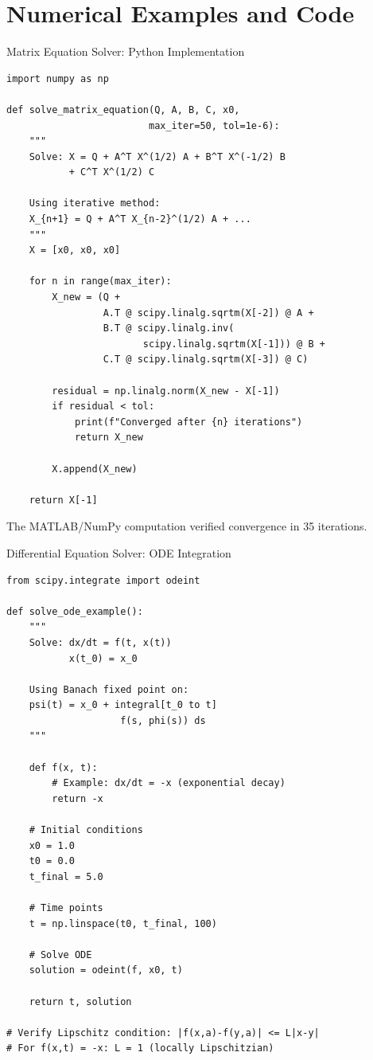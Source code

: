 \documentclass[aspectratio=169,10pt]{beamer}
\begin{document}

\section{Numerical Examples and Code}

\begin{frame}[fragile]{Matrix Equation Solver: Python Implementation}

\begin{lstlisting}
import numpy as np

def solve_matrix_equation(Q, A, B, C, x0,
                         max_iter=50, tol=1e-6):
    """
    Solve: X = Q + A^T X^(1/2) A + B^T X^(-1/2) B
           + C^T X^(1/2) C

    Using iterative method:
    X_{n+1} = Q + A^T X_{n-2}^(1/2) A + ...
    """
    X = [x0, x0, x0]

    for n in range(max_iter):
        X_new = (Q +
                 A.T @ scipy.linalg.sqrtm(X[-2]) @ A +
                 B.T @ scipy.linalg.inv(
                        scipy.linalg.sqrtm(X[-1])) @ B +
                 C.T @ scipy.linalg.sqrtm(X[-3]) @ C)

        residual = np.linalg.norm(X_new - X[-1])
        if residual < tol:
            print(f"Converged after {n} iterations")
            return X_new

        X.append(X_new)

    return X[-1]
\end{lstlisting}

The MATLAB/NumPy computation verified convergence in 35 iterations.

\end{frame}

\begin{frame}[fragile]{Differential Equation Solver: ODE Integration}

\begin{lstlisting}
from scipy.integrate import odeint

def solve_ode_example():
    """
    Solve: dx/dt = f(t, x(t))
           x(t_0) = x_0

    Using Banach fixed point on:
    psi(t) = x_0 + integral[t_0 to t]
                    f(s, phi(s)) ds
    """

    def f(x, t):
        # Example: dx/dt = -x (exponential decay)
        return -x

    # Initial conditions
    x0 = 1.0
    t0 = 0.0
    t_final = 5.0

    # Time points
    t = np.linspace(t0, t_final, 100)

    # Solve ODE
    solution = odeint(f, x0, t)

    return t, solution

# Verify Lipschitz condition: |f(x,a)-f(y,a)| <= L|x-y|
# For f(x,t) = -x: L = 1 (locally Lipschitzian)
\end{lstlisting}

\end{frame}
\end{document}
